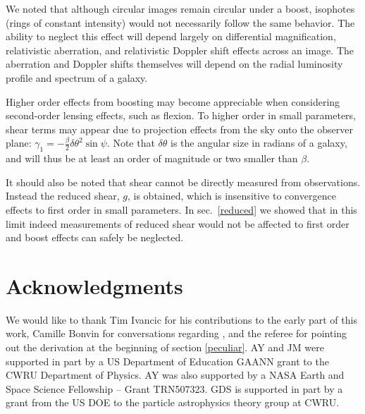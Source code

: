 \documentclass[useAMS,fleqn,usenatbib]{mn2e}
\begin{document}
We noted that although circular images remain circular under a boost, isophotes 
(rings of constant intensity) would not necessarily follow the same behavior. 
The ability to neglect this effect will depend largely on differential 
magnification, relativistic aberration, and relativistic Doppler shift effects 
across an image.  The aberration and Doppler shifts themselves will depend 
on the radial luminosity profile and spectrum of a galaxy.

Higher order effects from boosting may become appreciable when considering 
second-order lensing effects, such as flexion.  To
higher order in small parameters, {\color{red}shear terms may 
appear due to projection effects from the sky onto the observer plane:}
$\gamma_{1}=-\frac{\beta}{2}\delta\theta^{2}\sin\psi$.
Note that $\delta\theta$ is the angular size in radians of a galaxy, and 
will thus be at least an order of magnitude or two smaller than $\beta$.

It should also be noted that shear cannot be directly measured from observations.
Instead the reduced shear, $g$, is obtained, which is
insensitive to convergence effects to first order in small parameters.
In sec.~\ref{reduced} we showed that in this limit indeed measurements
of reduced shear would not be affected to first order and boost effects can 
safely be neglected. 


\section*{Acknowledgments}
We would like to thank Tim Ivancic for his contributions to the early part of this work, Camille Bonvin for conversations regarding \cite{Bonvin:2008ni}, and the referee for pointing out the derivation at the beginning of section \ref{peculiar}.
AY and JM were supported in part by a US Department of Education GAANN grant to the CWRU Department of Physics.  AY was also supported by a NASA Earth and Space Science Fellowship -- Grant TRN507323.
GDS is supported in part by a grant from the US DOE to the particle astrophysics theory group at CWRU.  


\end{document}
